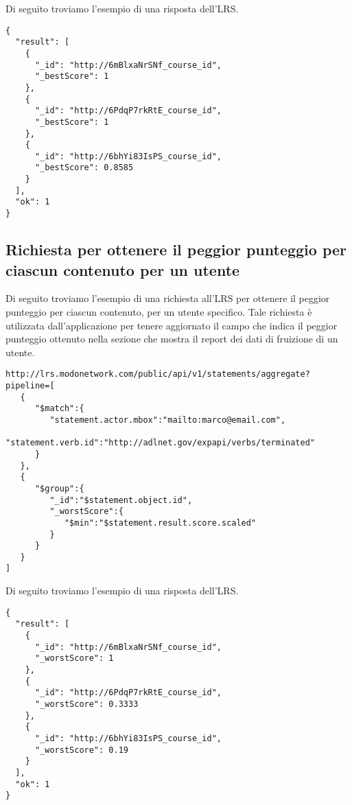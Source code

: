     Di seguito troviamo l'esempio di una risposta dell'LRS.
\begin{lstlisting}
{
  "result": [
    {
      "_id": "http://6mBlxaNrSNf_course_id",
      "_bestScore": 1
    },
    {
      "_id": "http://6PdqP7rkRtE_course_id",
      "_bestScore": 1
    },
    {
      "_id": "http://6bhYi83IsPS_course_id",
      "_bestScore": 0.8585
    }
  ],
  "ok": 1
}
\end{lstlisting}

    \subsection{Richiesta per ottenere il peggior punteggio per ciascun contenuto per un utente}
    Di seguito troviamo l'esempio di una richiesta all'LRS per ottenere il peggior punteggio per ciascun contenuto, per un utente specifico. Tale richiesta è utilizzata dall'applicazione per tenere aggiornato il campo che indica il peggior punteggio ottenuto nella sezione che mostra il report dei dati di fruizione di un utente.
\begin{lstlisting}
http://lrs.modonetwork.com/public/api/v1/statements/aggregate?pipeline=[
   {
      "$match":{
         "statement.actor.mbox":"mailto:marco@email.com",
         "statement.verb.id":"http://adlnet.gov/expapi/verbs/terminated"
      }
   },
   {
      "$group":{
         "_id":"$statement.object.id",
         "_worstScore":{
            "$min":"$statement.result.score.scaled"
         }
      }
   }
]
\end{lstlisting}
    
    Di seguito troviamo l'esempio di una risposta dell'LRS.
\begin{lstlisting}
{
  "result": [
    {
      "_id": "http://6mBlxaNrSNf_course_id",
      "_worstScore": 1
    },
    {
      "_id": "http://6PdqP7rkRtE_course_id",
      "_worstScore": 0.3333
    },
    {
      "_id": "http://6bhYi83IsPS_course_id",
      "_worstScore": 0.19
    }
  ],
  "ok": 1
}
\end{lstlisting}